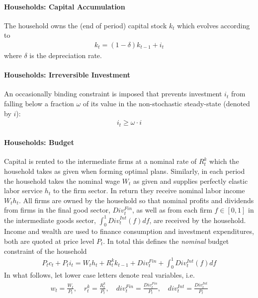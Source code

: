 \documentclass[a4paper]{scrartcl}
\begin{document}
\paragraph{Households: Capital Accumulation}
The household owns the (end of period) capital stock \(k_t\) which evolves according to
\begin{align}
k_t = (1-\delta)k_{t-1} + i_t \label{eq:RBCMonopIrrInv.CapitalAccumulation}
\end{align}
where \(\delta \) is the depreciation rate.

\paragraph{Households: Irreversible Investment}
An occasionally binding constraint is imposed that prevents investment \(i_t\) from falling below a fraction \(\omega \)
  of its value in the non-stochastic steady-state (denoted by \(i\)):
\begin{align}
i_t \geq \omega \cdot i \label{eq:RBCMonopIrrInv.IrrInvest}
\end{align}

\paragraph{Households: Budget}
Capital is rented to the intermediate firms at a nominal rate of \(R^k_{t}\) which the household takes as given when forming optimal plans.
Similarly, in each period the household takes the nominal wage \(W_t\) as given and supplies perfectly elastic labor service \(h_t\) to the firm sector.
In return they receive nominal labor income \(W_t h_t\).
All firms are owned by the household so that nominal profits and dividends from firms in the final good sector, \( Div^{Fin}_t\),
  as well as from each firm \(f\in[0,1]\) in the intermediate goods sector, \(\int_0^1 {Div}^{Int}_t(f)df\),
  are received by the household.
Income and wealth are used to finance consumption and investment expenditures, both are quoted at price level \(P_t\).
In total this defines the \emph{nominal} budget constraint of the household
\begin{align}
P_t c_t + P_t i_t =  W_t h_t + R^k_t k_{t-1} + Div^{Fin}_t + \int_0^1 Div^{Int}_t(f) df \label{eq:RBCMonopIrrInv.BudgetNominal}
\end{align}
In what follows, let lower case letters denote real variables, i.e.\
\begin{align*}
w_t = \frac{W_t}{P_t},\quad
r^k_t = \frac{R^k_t}{P_t},\quad
div^{Fin}_t = \frac{Div^{Fin}_t}{P_t},\quad
div^{Int}_t = \frac{Div^{Int}_t}{P_t}
\end{align*}
\end{document}
